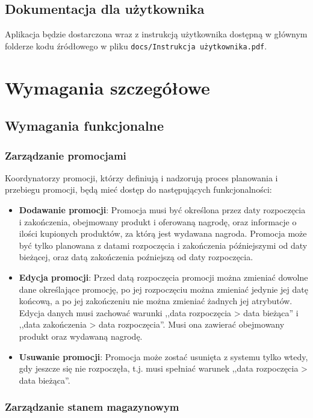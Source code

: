 \documentclass[a4paper,12pt]{article}
\begin{document}
\subsection{Dokumentacja dla użytkownika}

Aplikacja będzie dostarczona wraz z instrukcją użytkownika dostępną w głównym folderze kodu źródłowego w pliku \texttt{docs/Instrukcja użytkownika.pdf}.

\section{Wymagania szczegółowe}

\subsection{Wymagania funkcjonalne}

\subsubsection{Zarządzanie promocjami}

Koordynatorzy promocji, którzy definiują i nadzorują proces planowania i przebiegu promocji, będą mieć dostęp do następujących funkcjonalności:
\begin{itemize}
    \item \textbf{Dodawanie promocji}:
    Promocja musi być określona przez daty rozpoczęcia i zakończenia, obejmowany produkt i oferowaną nagrodę, oraz informacje o ilości kupionych produktów, za którą jest wydawana nagroda.
    Promocja może być tylko planowana z datami rozpoczęcia i zakończenia późniejszymi od daty bieżącej, oraz datą zakończenia poźniejszą od daty rozpoczęcia. 
    \item \textbf{Edycja promocji}:
    Przed datą rozpoczęcia promocji można zmieniać dowolne dane określające promocję, po jej rozpoczęciu można zmieniać jedynie jej datę końcową, a po jej zakończeniu nie można zmieniać żadnych jej atrybutów.
    Edycja danych musi zachować warunki ,,data rozpoczęcia > data bieżąca'' i ,,data zakończenia > data rozpoczęcia''.
    Musi ona zawierać obejmowany produkt oraz wydawaną nagrodę.
    \item \textbf{Usuwanie promocji}:
    Promocja może zostać usunięta z systemu tylko wtedy, gdy jeszcze się nie rozpoczęła, t.j. musi spełniać warunek ,,data rozpoczęcia > data bieżąca''.
\end{itemize}

\subsubsection{Zarządzanie stanem magazynowym}
\end{document}
